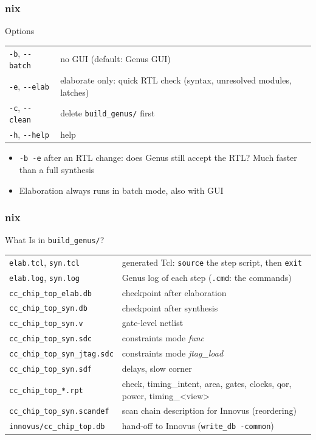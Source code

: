 \documentclass{beamer}
\newcommand{\astitle}{nix}
\newcommand{\assubtitle}{nix}
\newcommand{\cmd}[1]{\texttt{#1}}
\begin{document}
\renewcommand{\assubtitle}{Options}
\begin{frame}
\frametitle{\astitle}
\begin{block}{\assubtitle}
  \footnotesize
  \begin{tabularx}{\linewidth}{@{}lY@{}}
    \cmd{-b}, \cmd{-{}-batch}   & no GUI (default: Genus GUI)\\[2pt]
    \cmd{-e}, \cmd{-{}-elab}    & elaborate only: quick RTL check (syntax,
                                  unresolved modules, latches)\\[2pt]
    \cmd{-c}, \cmd{-{}-clean}   & delete \cmd{build\_genus/} first\\[2pt]
    \cmd{-h}, \cmd{-{}-help}    & help\\
  \end{tabularx}
  \vspace{6pt}
  \begin{itemize}
    \item \cmd{-b -e} after an RTL change: does Genus still accept the RTL?
      Much faster than a full synthesis
    \item Elaboration always runs in batch mode, also with GUI
  \end{itemize}
\end{block}
\end{frame}

\renewcommand{\assubtitle}{What Is in \texttt{build\_genus/}?}
\begin{frame}
\frametitle{\astitle}
\begin{block}{\assubtitle}
  \scriptsize
  \begin{tabularx}{\linewidth}{@{}lY@{}}
    \cmd{elab.tcl}, \cmd{syn.tcl}       & generated Tcl: \cmd{source} the step script, then \cmd{exit}\\[1pt]
    \cmd{elab.log}, \cmd{syn.log}       & Genus log of each step (\cmd{.cmd}: the commands)\\[1pt]
    \cmd{cc\_chip\_top\_elab.db}        & checkpoint after elaboration\\[1pt]
    \cmd{cc\_chip\_top\_syn.db}         & checkpoint after synthesis\\[1pt]
    \cmd{cc\_chip\_top\_syn.v}          & gate-level netlist\\[1pt]
    \cmd{cc\_chip\_top\_syn.sdc}        & constraints mode \emph{func}\\[1pt]
    \cmd{cc\_chip\_top\_syn\_jtag.sdc}  & constraints mode \emph{jtag\_load}\\[1pt]
    \cmd{cc\_chip\_top\_syn.sdf}        & delays, slow corner\\[1pt]
    \cmd{cc\_chip\_top\_*.rpt}          & check, timing\_intent, area, gates, clocks,
                                          qor, power, timing\_<view>\\[1pt]
    \cmd{cc\_chip\_top\_syn.scandef}    & scan chain description for Innovus (reordering)\\[1pt]
    \cmd{innovus/cc\_chip\_top.db}      & hand-off to Innovus (\cmd{write\_db -common})\\
  \end{tabularx}
\end{block}
\end{frame}
\end{document}
